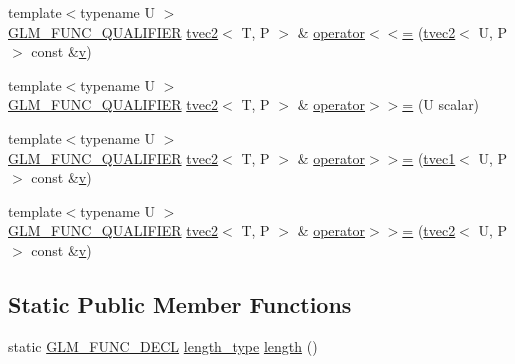 \begin{DoxyCompactItemize}
\item 
{\footnotesize template$<$typename U $>$ }\\\mbox{\hyperlink{setup_8hpp_a33fdea6f91c5f834105f7415e2a64407}{G\+L\+M\+\_\+\+F\+U\+N\+C\+\_\+\+Q\+U\+A\+L\+I\+F\+I\+ER}} \mbox{\hyperlink{structglm_1_1tvec2}{tvec2}}$<$ T, P $>$ \& \mbox{\hyperlink{structglm_1_1tvec2_adc5cbebcee78fbff8fee4978e4dd8c87}{operator$<$$<$=}} (\mbox{\hyperlink{structglm_1_1tvec2}{tvec2}}$<$ U, P $>$ const \&\mbox{\hyperlink{glad_8h_a14cfbe2fc2234f5504618905b69d1e06}{v}})
\item 
{\footnotesize template$<$typename U $>$ }\\\mbox{\hyperlink{setup_8hpp_a33fdea6f91c5f834105f7415e2a64407}{G\+L\+M\+\_\+\+F\+U\+N\+C\+\_\+\+Q\+U\+A\+L\+I\+F\+I\+ER}} \mbox{\hyperlink{structglm_1_1tvec2}{tvec2}}$<$ T, P $>$ \& \mbox{\hyperlink{structglm_1_1tvec2_ab3fb4bc1c2f4341932885837bb7e48d9}{operator$>$$>$=}} (U scalar)
\item 
{\footnotesize template$<$typename U $>$ }\\\mbox{\hyperlink{setup_8hpp_a33fdea6f91c5f834105f7415e2a64407}{G\+L\+M\+\_\+\+F\+U\+N\+C\+\_\+\+Q\+U\+A\+L\+I\+F\+I\+ER}} \mbox{\hyperlink{structglm_1_1tvec2}{tvec2}}$<$ T, P $>$ \& \mbox{\hyperlink{structglm_1_1tvec2_a7c5bc1c8d4d3f176b17cbc50ed99d953}{operator$>$$>$=}} (\mbox{\hyperlink{structglm_1_1tvec1}{tvec1}}$<$ U, P $>$ const \&\mbox{\hyperlink{glad_8h_a14cfbe2fc2234f5504618905b69d1e06}{v}})
\item 
{\footnotesize template$<$typename U $>$ }\\\mbox{\hyperlink{setup_8hpp_a33fdea6f91c5f834105f7415e2a64407}{G\+L\+M\+\_\+\+F\+U\+N\+C\+\_\+\+Q\+U\+A\+L\+I\+F\+I\+ER}} \mbox{\hyperlink{structglm_1_1tvec2}{tvec2}}$<$ T, P $>$ \& \mbox{\hyperlink{structglm_1_1tvec2_a6c2dc839f420cba67d7c0dfaab196081}{operator$>$$>$=}} (\mbox{\hyperlink{structglm_1_1tvec2}{tvec2}}$<$ U, P $>$ const \&\mbox{\hyperlink{glad_8h_a14cfbe2fc2234f5504618905b69d1e06}{v}})
\end{DoxyCompactItemize}
\subsection*{Static Public Member Functions}
\begin{DoxyCompactItemize}
\item 
static \mbox{\hyperlink{setup_8hpp_ab2d052de21a70539923e9bcbf6e83a51}{G\+L\+M\+\_\+\+F\+U\+N\+C\+\_\+\+D\+E\+CL}} \mbox{\hyperlink{structglm_1_1tvec2_a5a5ddebab821a3cf9185772386afbe8d}{length\+\_\+type}} \mbox{\hyperlink{structglm_1_1tvec2_a646329366ca3d3874854a5445aefd4ae}{length}} ()
\end{DoxyCompactItemize}
